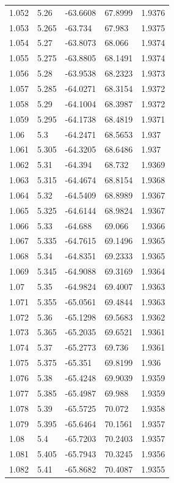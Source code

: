 \begin{tabular}{lllll}
1.052 & 5.26 & -63.6608 & 67.8999 & 1.9376 \\
1.053 & 5.265 & -63.734 & 67.983 & 1.9375 \\
1.054 & 5.27 & -63.8073 & 68.066 & 1.9374 \\
1.055 & 5.275 & -63.8805 & 68.1491 & 1.9374 \\
1.056 & 5.28 & -63.9538 & 68.2323 & 1.9373 \\
1.057 & 5.285 & -64.0271 & 68.3154 & 1.9372 \\
1.058 & 5.29 & -64.1004 & 68.3987 & 1.9372 \\
1.059 & 5.295 & -64.1738 & 68.4819 & 1.9371 \\
1.06 & 5.3 & -64.2471 & 68.5653 & 1.937 \\
1.061 & 5.305 & -64.3205 & 68.6486 & 1.937 \\
1.062 & 5.31 & -64.394 & 68.732 & 1.9369 \\
1.063 & 5.315 & -64.4674 & 68.8154 & 1.9368 \\
1.064 & 5.32 & -64.5409 & 68.8989 & 1.9367 \\
1.065 & 5.325 & -64.6144 & 68.9824 & 1.9367 \\
1.066 & 5.33 & -64.688 & 69.066 & 1.9366 \\
1.067 & 5.335 & -64.7615 & 69.1496 & 1.9365 \\
1.068 & 5.34 & -64.8351 & 69.2333 & 1.9365 \\
1.069 & 5.345 & -64.9088 & 69.3169 & 1.9364 \\
1.07 & 5.35 & -64.9824 & 69.4007 & 1.9363 \\
1.071 & 5.355 & -65.0561 & 69.4844 & 1.9363 \\
1.072 & 5.36 & -65.1298 & 69.5683 & 1.9362 \\
1.073 & 5.365 & -65.2035 & 69.6521 & 1.9361 \\
1.074 & 5.37 & -65.2773 & 69.736 & 1.9361 \\
1.075 & 5.375 & -65.351 & 69.8199 & 1.936 \\
1.076 & 5.38 & -65.4248 & 69.9039 & 1.9359 \\
1.077 & 5.385 & -65.4987 & 69.988 & 1.9359 \\
1.078 & 5.39 & -65.5725 & 70.072 & 1.9358 \\
1.079 & 5.395 & -65.6464 & 70.1561 & 1.9357 \\
1.08 & 5.4 & -65.7203 & 70.2403 & 1.9357 \\
1.081 & 5.405 & -65.7943 & 70.3245 & 1.9356 \\
1.082 & 5.41 & -65.8682 & 70.4087 & 1.9355 \\

\end{tabular}
